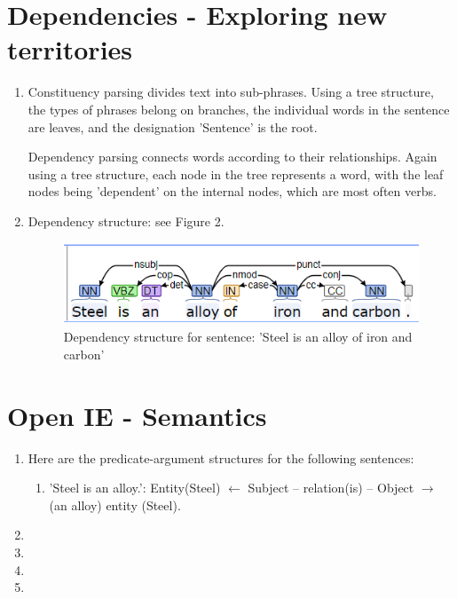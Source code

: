 \documentclass{article}
\begin{document}
\section{Dependencies - Exploring new territories}
\begin{enumerate}
  \item Constituency parsing divides text into sub-phrases. Using a tree
  structure, the types of phrases belong on branches, the individual words in
  the sentence are leaves, and the designation 'Sentence' is the root.\par

  \noindent Dependency parsing connects words according to their relationships.
  Again using a tree structure, each node in the tree represents a word, with
  the leaf nodes being 'dependent' on the internal nodes, which are most often
  verbs.
  \item Dependency structure: see Figure 2.
  \begin{figure}
    \includegraphics[width=\linewidth]{task3dep.PNG}
    \caption{Dependency structure for sentence: 'Steel is an alloy of iron and
    carbon'}
    \label{Cstruct}
  \end{figure}
\end{enumerate}

\section{Open IE - Semantics}
\begin{enumerate}
  \item Here are the predicate-argument structures for the following sentences:
  \begin{enumerate}
    \item 'Steel is an alloy.': Entity(Steel) $\leftarrow$ Subject --
    relation(is) -- Object $\rightarrow$ (an alloy) entity (Steel).
  \end{enumerate}
  \item
  \item
  \item
  \item
\end{enumerate}
\end{document}
